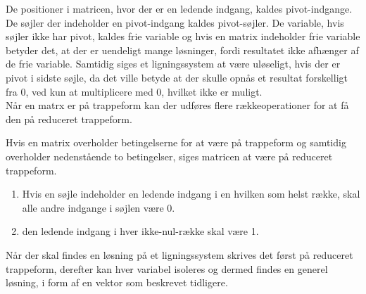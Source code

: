 De positioner i matricen, hvor der er en ledende indgang, kaldes pivot-indgange. De søjler der indeholder en pivot-indgang kaldes pivot-søjler. De variable, hvis søjler ikke har pivot, kaldes frie variable og hvis en matrix indeholder frie variable betyder det, at der er uendeligt mange løsninger, fordi resultatet ikke afhænger af de frie variable. Samtidig siges et ligningssystem at være uløseligt, hvis der er pivot i sidste søjle, da det ville betyde at der skulle opnås et resultat forskelligt fra 0, ved kun at multiplicere med 0, hvilket ikke er muligt.\\
Når en matrx er på trappeform kan der udføres flere rækkeoperationer for at få den på reduceret trappeform.

\begin{defn}
Hvis en matrix overholder betingelserne for at være på trappeform og samtidig overholder nedenstående to betingelser, siges matricen at være på reduceret trappeform.
\begin{enumerate}
\item Hvis en søjle indeholder en ledende indgang i en hvilken som helst række, skal alle andre indgange i søjlen være 0.
\item den ledende indgang i hver ikke-nul-række skal være 1.
\end{enumerate}
\end{defn}

Når der skal findes en løsning på et ligningssystem skrives det først på reduceret trappeform, derefter kan hver variabel isoleres og dermed findes en generel løsning, i form af en vektor som beskrevet tidligere. 
 
